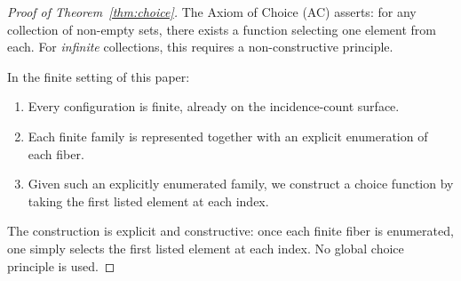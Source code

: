 \label{sec:appendix-foundations}

\begin{proof}[Proof of Theorem~\ref{thm:choice}]
\label{proof:thm:choice}
The Axiom of Choice (AC) asserts: for any collection of non-empty sets, there exists a function selecting one element from each. For \emph{infinite} collections, this requires a non-constructive principle.

In the finite setting of this paper:
\begin{enumerate}[label=(\roman*), itemsep=0.2em]
\item Every configuration is finite, already on the incidence-count surface.
\item Each finite family is represented together with an explicit enumeration of each fiber.
\item Given such an explicitly enumerated family, we construct a choice function by taking the first listed element at each index.
\end{enumerate}
The construction is explicit and constructive: once each finite fiber is enumerated, one simply selects the first listed element at each index. No global choice principle is used.
\end{proof}
